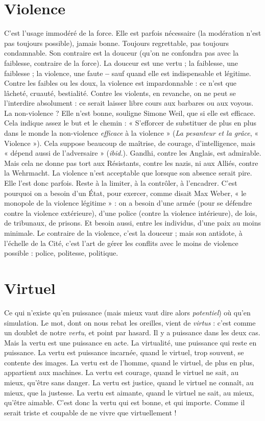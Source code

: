 \section{Violence}
C'est l’usage immodéré de la force. Elle est parfois nécessaire (la
modération n’est pas toujours possible), jamais bonne. Toujours
regrettable, pas toujours condamnable. Son contraire est la douceur
(qu’on ne confondra pas avec la faiblesse, contraire de la force). La douceur est
une vertu ; la faiblesse, une faiblesse ; la violence, une faute {\bf --} sauf quand elle
est indispensable et légitime. Contre les faibles ou les doux, la violence est
impardonnable : ce n’est que lâcheté, cruauté, bestialité. Contre les violents, en
revanche, on ne peut se l’interdire absolument : ce serait laisser libre cours aux
barbares ou aux voyous. La non-violence ? Elle n’est bonne, souligne Simone
Weil, que si elle est efficace. Cela indique assez le but et le chemin : « S’efforcer
de substituer de plus en plus dans le monde la non-violence {\it efficace} à la
violence » ({\it La pesanteur et la grâce}, « Violence »). Cela suppose beaucoup de
maîtrise, de courage, d'intelligence, mais « dépend aussi de l’adversaire » ({\it ibid.}).
Gandhi, contre les Anglais, est admirable. Mais cela ne donne pas tort aux
Résistants, contre les nazis, ni aux Alliés, contre la Wehrmacht. La violence
n’est acceptable que lorsque son absence serait pire. Elle l’est donc parfois.
Reste à la limiter, à la contrôler, à l’encadrer. C’est pourquoi on a besoin d’un
État, pour exercer, comme disait Max Weber, « le monopole de la violence
légitime » : on a besoin d’une armée (pour se défendre contre la violence extérieure),
d’une police (contre la violence intérieure), de lois, de tribunaux, de
prisons. Et besoin aussi, entre les individus, d’une paix au moins minimale.
Le contraire de la violence, c’est la douceur ; mais son antidote, à l'échelle de la
Cité, c’est l’art de gérer les conflits avec le moins de violence possible : police,
politesse, politique.

\section{Virtuel}
Ce qui n’existe qu’en puissance (mais mieux vaut dire alors {\it potentiel})
où qu’en simulation. Le mot, dont on nous rebat les oreilles,
vient de {\it virtus} : c’est comme un doublet de notre {\it vertu}, et point par hasard. Il
y a puissance dans les deux cas. Mais la vertu est une puissance en acte. La
virtualité, une puissance qui reste en puissance. La vertu est puissance incarnée,
quand le virtuel, trop souvent, se contente des images. La vertu est de l’homme,
quand le virtuel, de plus en plus, appartient aux machines. La vertu est courage,
quand le virtuel ne sait, au mieux, qu'être sans danger. La vertu est justice, quand
le virtuel ne connaît, au mieux, que la justesse. La vertu est aimante, quand le virtuel
ne sait, au mieux, qu'être aimable.
C’est donc la vertu qui est bonne, et qui importe. Comme il serait triste et
coupable de ne vivre que virtuellement !


